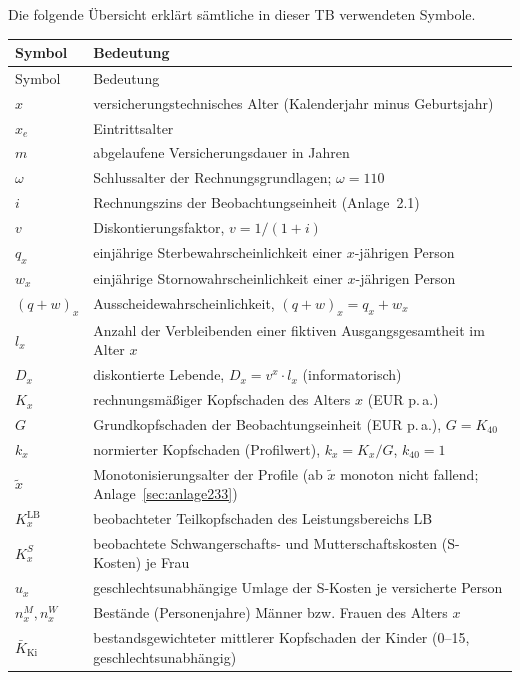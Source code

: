 Die folgende Übersicht erklärt sämtliche in dieser TB verwendeten Symbole.

\begin{center}\small
\begin{longtable}{@{}lp{13.5cm}@{}}
\toprule
Symbol & Bedeutung \\
\midrule
\endfirsthead
\toprule
Symbol & Bedeutung \\
\midrule
\endhead
\bottomrule
\endfoot
$x$ & versicherungstechnisches Alter (Kalenderjahr minus Geburtsjahr) \\
$x_e$ & Eintrittsalter \\
$m$ & abgelaufene Versicherungsdauer in Jahren \\
$\omega$ & Schlussalter der Rechnungsgrundlagen; $\omega = 110$ \\
$i$ & Rechnungszins der Beobachtungseinheit (Anlage~2.1) \\
$v$ & Diskontierungsfaktor, $v = 1/(1+i)$ \\
$q_x$ & einjährige Sterbewahrscheinlichkeit einer $x$-jährigen Person \\
$w_x$ & einjährige Stornowahrscheinlichkeit einer $x$-jährigen Person \\
$(q+w)_x$ & Ausscheidewahrscheinlichkeit, $(q+w)_x = q_x + w_x$ \\
$l_x$ & Anzahl der Verbleibenden einer fiktiven Ausgangsgesamtheit im Alter $x$ \\
$D_x$ & diskontierte Lebende, $D_x = v^x\cdot l_x$ (informatorisch) \\
$K_x$ & rechnungsmäßiger Kopfschaden des Alters $x$ (EUR p.\,a.) \\
$G$ & Grundkopfschaden der Beobachtungseinheit (EUR p.\,a.), $G = K_{40}$ \\
$k_x$ & normierter Kopfschaden (Profilwert), $k_x = K_x / G$, $k_{40}=1$ \\
$\tilde{x}$ & Monotonisierungsalter der Profile (ab $\tilde{x}$ monoton nicht fallend; Anlage~\ref{sec:anlage233}) \\
$K_x^{\mathrm{LB}}$ & beobachteter Teilkopfschaden des Leistungsbereichs LB \\
$K_x^{S}$ & beobachtete Schwangerschafts- und Mutterschaftskosten (S-Kosten) je Frau \\
$u_x$ & geschlechtsunabhängige Umlage der S-Kosten je versicherte Person \\
$n_x^{M}, n_x^{W}$ & Bestände (Personenjahre) Männer bzw. Frauen des Alters $x$ \\
$\bar{K}_{\mathrm{Ki}}$ & bestandsgewichteter mittlerer Kopfschaden der Kinder (0--15, geschlechtsunabhängig) \\

\end{longtable}
\end{center}

